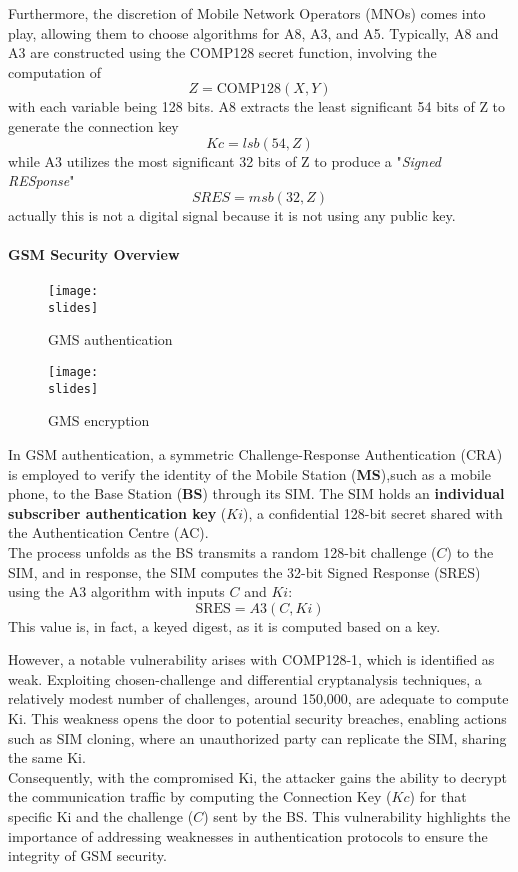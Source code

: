 {  Furthermore, the discretion of Mobile Network Operators (MNOs) comes into play, allowing them to choose algorithms for A8, A3, and A5. Typically, A8 and A3 are constructed using the COMP128 secret function, involving the computation of \[Z = \text{COMP128}(X, Y)\]
  with each variable being 128 bits.
  A8 extracts the least significant 54 bits of Z to generate the connection key \[Kc = lsb( 54, Z )\]
  while A3 utilizes the most significant 32 bits of Z to produce a "\textit{Signed RESponse}" \[SRES = msb( 32, Z )\]
  actually this is not a digital signal because it is not using any public key.

  \paragraph{GSM Security Overview}
  \begin{figure}[h]
    \centering
    \texttt{[image: \\slides]}
    \caption{GMS authentication}
  \end{figure}
  \begin{figure}[h]
    \centering
    \texttt{[image: \\slides]}
    \caption{GMS encryption}
  \end{figure}
  In GSM authentication, a symmetric Challenge-Response Authentication (CRA) is employed to verify the identity of the Mobile Station (\textbf{MS}),such as a mobile phone, to the Base Station (\textbf{BS}) through its SIM.
  The SIM holds an \textbf{individual subscriber authentication key} ($Ki$), a confidential 128-bit secret shared with the Authentication Centre (AC). \\
  The process unfolds as the BS transmits a random 128-bit challenge ($C$) to the SIM, and in response, the SIM computes the 32-bit Signed Response (SRES) using the A3 algorithm with inputs $C$ and $Ki$:
  \[\text{SRES} = A3( C, Ki )\]
  This value is, in fact, a keyed digest, as it is computed based on a key.


  However, a notable vulnerability arises with COMP128-1, which is identified as weak. Exploiting chosen-challenge and differential cryptanalysis techniques, a relatively modest number of challenges, around 150,000, are adequate to compute Ki. This weakness opens the door to potential security breaches, enabling actions such as SIM cloning, where an unauthorized party can replicate the SIM, sharing the same Ki.\\
  Consequently, with the compromised Ki, the attacker gains the ability to decrypt the communication traffic by computing the Connection Key ($Kc$) for that specific Ki and the challenge ($C$) sent by the BS. This vulnerability highlights the importance of addressing weaknesses in authentication protocols to ensure the integrity of GSM security.
}{}


